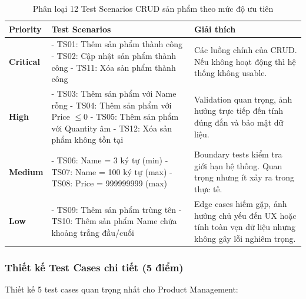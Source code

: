 \documentclass[a4paper,12pt]{article}
\begin{document}
\begin{table}[H]
\centering
\begin{tabularx}{\textwidth}{|p{2.5cm}|>{\raggedright\arraybackslash}X|>{\raggedright\arraybackslash}X|}
\hline
\textbf{Priority} & \textbf{Test Scenarios} & \textbf{Giải thích} \\ \hline

\textbf{Critical} &
- TS01: Thêm sản phẩm thành công \newline
- TS02: Cập nhật sản phẩm thành công \newline
- TS11: Xóa sản phẩm thành công &
Các luồng chính của CRUD. Nếu không hoạt động thì hệ thống không usable. \\ \hline

\textbf{High} &
- TS03: Thêm sản phẩm với Name rỗng \newline
- TS04: Thêm sản phẩm với Price $\leq 0$ \newline
- TS05: Thêm sản phẩm với Quantity âm \newline
- TS12: Xóa sản phẩm không tồn tại &
Validation quan trọng, ảnh hưởng trực tiếp đến tính đúng đắn và bảo mật dữ liệu. \\ \hline

\textbf{Medium} &
- TS06: Name = 3 ký tự (min) \newline
- TS07: Name = 100 ký tự (max) \newline
- TS08: Price = 999999999 (max) &
Boundary tests kiểm tra giới hạn hệ thống. Quan trọng nhưng ít xảy ra trong thực tế. \\ \hline

\textbf{Low} &
- TS09: Thêm sản phẩm trùng tên \newline
- TS10: Thêm sản phẩm Name chứa khoảng trắng đầu/cuối &
Edge cases hiếm gặp, ảnh hưởng chủ yếu đến UX hoặc tính toàn vẹn dữ liệu nhưng không gây lỗi nghiêm trọng. \\ \hline

\end{tabularx}
\caption{Phân loại 12 Test Scenarios CRUD sản phẩm theo mức độ ưu tiên}
\end{table}


\subsubsection{Thiết kế Test Cases chi tiết (5 điểm)}
Thiết kế 5 test cases quan trọng nhất cho Product Management:
\end{document}
